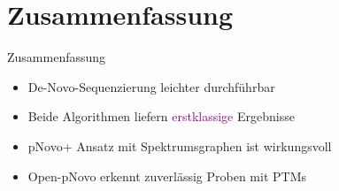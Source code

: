 \documentclass{beamer}
\begin{document}
    \section{Zusammenfassung}
   \begin{frame}{Zusammenfassung}
     \begin{itemize}
     \item<1-> De-Novo-Sequenzierung leichter durchführbar
     \item<2-> Beide Algorithmen liefern \textcolor{purple}{erstklassige} Ergebnisse
     \item<3-> pNovo+ Ansatz mit Spektrumsgraphen ist wirkungsvoll
      \item<4-> Open-pNovo erkennt zuverlässig Proben mit PTMs
     \end{itemize}
    \end{frame}
\end{document}

